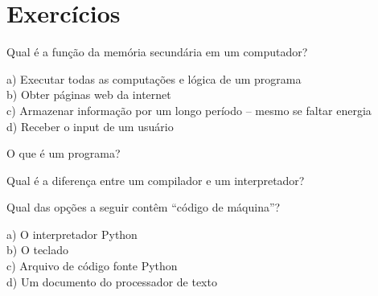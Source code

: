 \section{Exercícios}
%
%
\begin{ex}
Qual é a função da memória secundária em um computador?

a) Executar todas as computações e lógica de um programa\\
b) Obter páginas web da internet\\
c) Armazenar informação por um longo período -- mesmo se faltar energia\\
d) Receber o input de um usuário
\end{ex}
%
%

\begin{ex}
O que é um programa?
\end{ex}
%

\begin{ex}
Qual é a diferença entre um compilador e um interpretador?
\end{ex}
%
%

\begin{ex}
Qual das opções a seguir contêm ``código de máquina''?

a) O interpretador Python\\
b) O teclado\\
c) Arquivo de código fonte Python\\
d) Um documento do processador de texto
\end{ex}
%
%

